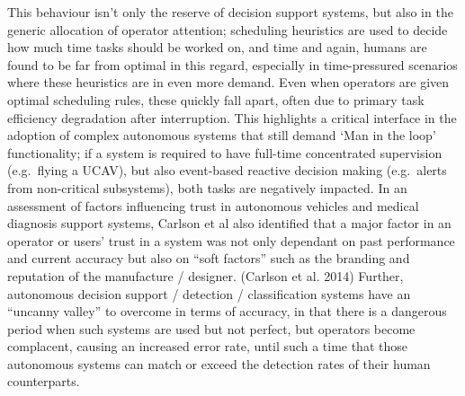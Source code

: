 This behaviour isn't only the reserve of decision support systems, but also in the generic allocation of operator attention; scheduling heuristics are used to decide how much time tasks should be worked on, and time and again, humans are found to be far from optimal in this regard, especially in time-pressured scenarios where these heuristics are in even more demand.
Even when operators are given optimal scheduling rules, these quickly fall apart, often due to primary task efficiency degradation after interruption.
This highlights a critical interface in the adoption of complex autonomous systems that still demand ‘Man in the loop’ functionality; if a system is required to have full-time concentrated supervision (e.g.\ flying a UCAV), but also event-based reactive decision making (e.g.\ alerts from non-critical subsystems), both tasks are negatively impacted.
In an assessment of factors influencing trust in autonomous vehicles and medical diagnosis support systems, Carlson et al also identified that a major factor in an operator or users’ trust in a system was not only dependant on past performance and current accuracy but also on ``soft factors'' such as the branding and reputation of the manufacture / designer. (Carlson et al. 2014)
Further, autonomous decision support / detection / classification systems have an ``uncanny valley'' to overcome in terms of accuracy, in that there is a dangerous period when such systems are used but not perfect, but operators become complacent, causing an increased error rate, until such a time that those autonomous systems can match or exceed the detection rates of their human counterparts.
